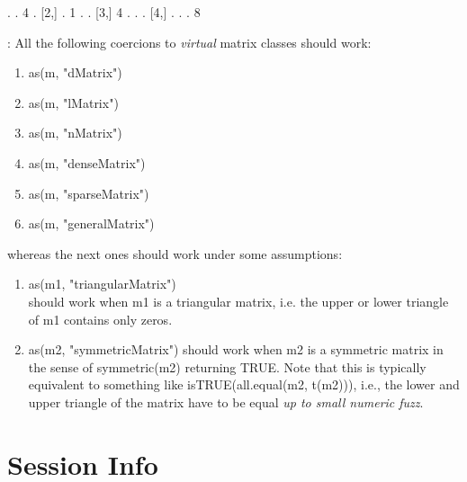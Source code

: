 \documentclass{article}
\begin{document}
{\begin{description}
\begin{Schunk}
\begin{Soutput}
[1,] . . 4 .
[2,] . 1 . .
[3,] 4 . . .
[4,] . . . 8
\end{Soutput}
\end{Schunk}


\item[Rule~3]: All the following coercions to \emph{virtual} matrix
  classes should work:\\
  \begin{enumerate}
  \item{as(m, "dMatrix")}
  \item{as(m, "lMatrix")}
  \item{as(m, "nMatrix")}

  \item{as(m, "denseMatrix")}
  \item{as(m, "sparseMatrix")}

  \item{as(m, "generalMatrix")}
  \end{enumerate}
  whereas the next ones should work under some assumptions:

  \begin{enumerate}
  \item{as(m1, "triangularMatrix")} \\
       should work when m1 is a triangular matrix, i.e. the upper or
       lower triangle of m1 contains only zeros.

  \item{as(m2, "symmetricMatrix")}
       should work when m2 is a symmetric matrix in the sense of
       symmetric(m2) returning TRUE.
       Note that this is typically equivalent to something like
       isTRUE(all.equal(m2, t(m2))), i.e., the lower and upper
       triangle of the matrix have to be equal \emph{up to small
       numeric fuzz}.
  \end{enumerate}

\end{description}



\section{Session Info}

}
\end{document}
